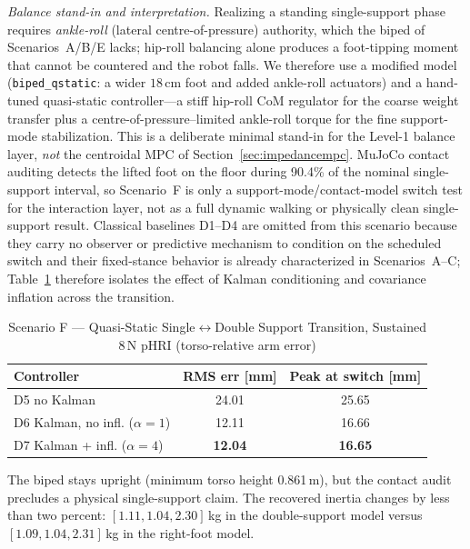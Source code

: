 \emph{Balance stand-in and interpretation.} Realizing a standing single-support
phase requires \emph{ankle-roll} (lateral centre-of-pressure) authority, which
the biped of Scenarios~A/B/E lacks; hip-roll balancing alone produces a
foot-tipping moment that cannot be countered and the robot falls. We therefore
use a modified model (\texttt{biped\_qstatic}: a wider $18$\,cm foot and added
ankle-roll actuators) and a hand-tuned quasi-static controller---a stiff
hip-roll CoM regulator for the coarse weight transfer plus a
centre-of-pressure--limited ankle-roll torque for the fine support-mode
stabilization. This is a deliberate minimal stand-in for the Level-1 balance
layer, \emph{not} the centroidal MPC of Section~\ref{sec:impedancempc}.
MuJoCo contact auditing detects the lifted foot on the floor during 90.4\% of
the nominal single-support interval, so Scenario~F is only a
support-mode/contact-model switch test for the interaction layer, not as a full
dynamic walking or physically clean single-support result. Classical baselines
D1--D4 are omitted from this scenario because they carry no observer or
predictive mechanism to condition on the scheduled switch and their
fixed-stance behavior is already characterized in Scenarios~A--C;
Table~\ref{tab:scenarioF} therefore isolates the effect of Kalman conditioning
and covariance inflation across the transition.

\begin{table}[!t]
\caption{Scenario F --- Quasi-Static Single$\leftrightarrow$Double Support
         Transition, Sustained 8\,N pHRI (torso-relative arm error)}
\label{tab:scenarioF}
\renewcommand{\arraystretch}{1.2}
\centering
\begin{tabular}{@{}lcc@{}}
\toprule
\textbf{Controller} & \textbf{RMS err [mm]} & \textbf{Peak at switch [mm]} \\
\midrule
D5 no Kalman               & 24.01 & 25.65 \\
D6 Kalman, no infl. ($\alpha=1$) & 12.11 & 16.66 \\
D7 Kalman + infl. ($\alpha=4$)   & \textbf{12.04} & \textbf{16.65} \\
\bottomrule
\end{tabular}
\end{table}

The biped stays upright (minimum torso height 0.861\,m), but the contact audit
precludes a physical single-support claim. The recovered inertia changes by
less than two percent: $[1.11,1.04,2.30]$\,kg in the double-support model
versus $[1.09,1.04,2.31]$\,kg in the right-foot model.

